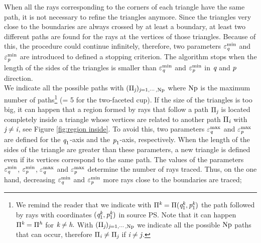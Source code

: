 When all the rays corresponding to the corners of each triangle have the same path, it is not necessary to refine the triangles anymore.
Since the triangles very close to the boundaries are always crossed by at least a boundary, at least two different paths are found for the rays at the vertices of those triangles. 
Because of this, the procedure could continue infinitely, therefore, two parameters $\varepsilon_{\textit{q}}^\textrm{min}$ and $\varepsilon_{\textit{p}}^\textrm{min}$ are introduced to defined a stopping criterion.
The algorithm stops when the length of the sides of the triangles is smaller than $\varepsilon_{\textit{q}}^\textrm{min}$ and $\varepsilon_{\textit{p}}^\textrm{min}$ in $\textit{q}$ and $\textit{p}$ direction. \\ \indent 
We indicate all the possible paths with $(\Pi_{\textit{j}})_{\textit{j}=1, \cdots, \textrm{Np}}$ where $\textrm{Np}$ is the maximum number of paths\footnote{We remind the reader that we indicate with $\Pi^{\textit{k}} = \Pi(\textit{q}_1^{\textit{k}},\textit{p}_1^{\textit{k}})$ the path followed by rays with coordinates $(\textit{q}_1^{\textit{k}},\textit{p}_1^{\textit{k}})$ in source PS. Note that it
can happen $\Pi^{\textit{k}}= \Pi^{\textit{h}}$ for $\textit{k}\neq\textit{h}.$
With $(\Pi_{\textit{j}})_{\textit{j}=1, \cdots, \textrm{Np}}$ we indicate all the possible $\textrm{Np}$ paths that can occur, therefore $\Pi_{\textit{i}}\neq\Pi_{\textit{j}}$ if $\textit{i}\neq\textit{j}$.} (\npath = 5 for the two-faceted cup).
If the size of the triangles is too big, it can happen that a region formed by rays that follow a path $\Pi_{\textit{j}}$ is located completely inside a triangle whose vertices are related to another path $\Pi_{\textit{i}}$ with $\textit{j} \neq  \textit{i}$, see Figure \ref{fig:region inside}.
To avoid this, two parameters $\varepsilon_{\textit{q}}^{\textrm{max}}$ and $\varepsilon_{\textit{p}}^{\textrm{max}}$ are defined for the $\textit{q}_1$-axis and the $\textit{p}_1$-axis, respectively.
When the length of the sides of the triangle are greater than these parameters, a new triangle is defined even if its vertices correspond to the same path.
The values of the parameters $\varepsilon_{\textit{q}}^\textrm{min}$, $\varepsilon_{\textit{p}}^\textrm{min}$, $\varepsilon_{\textit{q}}^\textrm{max}$ and $\varepsilon_{\textit{p}}^\textrm{max}$ determine the number of rays traced.
Thus, on the one hand, decreasing $\varepsilon_{\textit{q}}^\textrm{min}$ and $\varepsilon_{\textit{p}}^\textrm{min}$ more rays close to the boundaries are traced;
